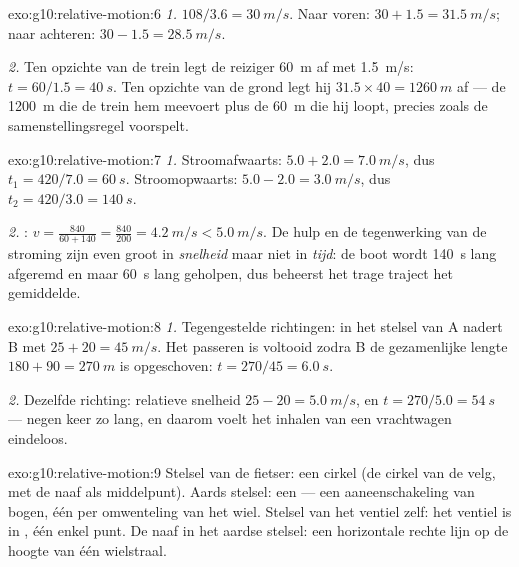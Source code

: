 \begin{solution}{exo:g10:relative-motion:6}
\emph{1.} $108/3.6 = \qty{30}{m/s}$. Naar voren:
$30 + 1.5 = \qty{31.5}{m/s}$; naar achteren:
$30 - 1.5 = \qty{28.5}{m/s}$.

\emph{2.} Ten opzichte van de trein legt de reiziger \qty{60}{m} af met
\qty{1.5}{m/s}: $t = 60/1.5 = \qty{40}{s}$. Ten opzichte van de grond
legt hij $31.5 \times 40 = \qty{1260}{m}$ af --- de \qty{1200}{m} die de
trein hem meevoert plus de \qty{60}{m} die hij loopt, precies zoals de
samenstellingsregel voorspelt.
\end{solution}

\begin{solution}{exo:g10:relative-motion:7}
\emph{1.} Stroomafwaarts: $5.0 + 2.0 = \qty{7.0}{m/s}$, dus
$t_1 = 420/7.0 = \qty{60}{s}$. Stroomopwaarts:
$5.0 - 2.0 = \qty{3.0}{m/s}$, dus $t_2 = 420/3.0 = \qty{140}{s}$.

\emph{2.} : $v = \frac{840}{60 + 140}
= \frac{840}{200} = \qty{4.2}{m/s} < \qty{5.0}{m/s}$. De hulp en de
tegenwerking van de stroming zijn even groot in \emph{snelheid} maar
niet in \emph{tijd}: de boot wordt \qty{140}{s} lang afgeremd en maar
\qty{60}{s} lang geholpen, dus beheerst het trage traject het
gemiddelde.
\end{solution}

\begin{solution}{exo:g10:relative-motion:8}
\emph{1.} Tegengestelde richtingen: in het stelsel van A nadert B met
$25 + 20 = \qty{45}{m/s}$. Het passeren is voltooid zodra B de
gezamenlijke lengte $180 + 90 = \qty{270}{m}$ is opgeschoven:
$t = 270/45 = \qty{6.0}{s}$.

\emph{2.} Dezelfde richting: relatieve snelheid
$25 - 20 = \qty{5.0}{m/s}$, en $t = 270/5.0 = \qty{54}{s}$ --- negen
keer zo lang, en daarom voelt het inhalen van een vrachtwagen
eindeloos.
\end{solution}

\begin{solution}{exo:g10:relative-motion:9}
Stelsel van de fietser: een cirkel (de cirkel van de velg, met de naaf
als middelpunt). Aards stelsel: een  --- een aaneenschakeling
van bogen, één per omwenteling van het wiel. Stelsel van het ventiel
zelf: het ventiel is in , één enkel punt. De naaf in het aardse
stelsel: een horizontale rechte lijn op de hoogte van één wielstraal.
\end{solution}


